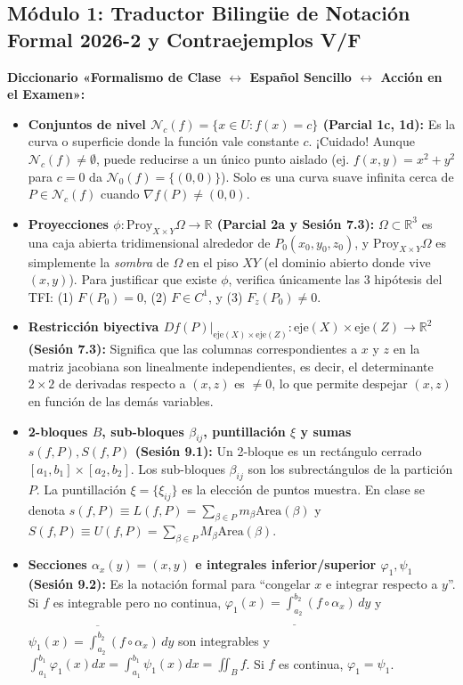 \documentclass[11pt,a4paper]{article}
\begin{document}
\subsection{Módulo 1: Traductor Bilingüe de Notación Formal 2026-2 y Contraejemplos V/F}

\begin{intuitionbox}
\textbf{Diccionario «Formalismo de Clase $\leftrightarrow$ Español Sencillo $\leftrightarrow$ Acción en el Examen»:}
\begin{itemize}[leftmargin=1.5em]
  \item \textbf{Conjuntos de nivel $\mathcal{N}_c(f) = \{x \in U : f(x) = c\}$ (Parcial 1c, 1d):} Es la curva o superficie donde la función vale constante $c$. ¡Cuidado! Aunque $\mathcal{N}_c(f) \neq \emptyset$, puede reducirse a un único punto aislado (ej. $f(x,y)=x^2+y^2$ para $c=0$ da $\mathcal{N}_0(f)=\{(0,0)\}$). Solo es una curva suave infinita cerca de $P \in \mathcal{N}_c(f)$ cuando $\nabla f(P) \neq (0,0)$.
  \item \textbf{Proyecciones $\phi: \text{Proy}_{X\times Y}\Omega \to \mathbb{R}$ (Parcial 2a y Sesión 7.3):} $\Omega \subset \mathbb{R}^3$ es una caja abierta tridimensional alrededor de $P_0(x_0,y_0,z_0)$, y $\text{Proy}_{X\times Y}\Omega$ es simplemente la \emph{sombra} de $\Omega$ en el piso $XY$ (el dominio abierto donde vive $(x,y)$). Para justificar que existe $\phi$, verifica únicamente las 3 hipótesis del TFI: (1) $F(P_0)=0$, (2) $F \in C^1$, y (3) $F_z(P_0) \neq 0$.
  \item \textbf{Restricción biyectiva $Df(P)|_{\text{eje}(X)\times\text{eje}(Z)}: \text{eje}(X)\times\text{eje}(Z) \to \mathbb{R}^2$ (Sesión 7.3):} Significa que las columnas correspondientes a $x$ y $z$ en la matriz jacobiana son linealmente independientes, es decir, el determinante $2\times 2$ de derivadas respecto a $(x,z)$ es $\neq 0$, lo que permite despejar $(x,z)$ en función de las demás variables.
  \item \textbf{2-bloques $B$, sub-bloques $\beta_{ij}$, puntillación $\xi$ y sumas $s(f,P), S(f,P)$ (Sesión 9.1):} Un 2-bloque es un rectángulo cerrado $[a_1,b_1]\times[a_2,b_2]$. Los sub-bloques $\beta_{ij}$ son los subrectángulos de la partición $P$. La puntillación $\xi = \{\xi_{ij}\}$ es la elección de puntos muestra. En clase se denota $s(f,P) \equiv L(f,P) = \sum_{\beta\in P} m_\beta \text{Area}(\beta)$ y $S(f,P) \equiv U(f,P) = \sum_{\beta\in P} M_\beta \text{Area}(\beta)$.
  \item \textbf{Secciones $\alpha_x(y) = (x,y)$ e integrales inferior/superior $\varphi_1, \psi_1$ (Sesión 9.2):} Es la notación formal para ``congelar $x$ e integrar respecto a $y$''. Si $f$ es integrable pero no continua, $\varphi_1(x) = \underline{\int_{a_2}^{b_2}} (f\circ \alpha_x)\,dy$ y $\psi_1(x) = \overline{\int_{a_2}^{b_2}} (f\circ \alpha_x)\,dy$ son integrables y $\int_{a_1}^{b_1}\varphi_1(x)dx = \int_{a_1}^{b_1}\psi_1(x)dx = \iint_B f$. Si $f$ es continua, $\varphi_1 = \psi_1$.

\end{itemize}
\end{intuitionbox}
\end{document}

